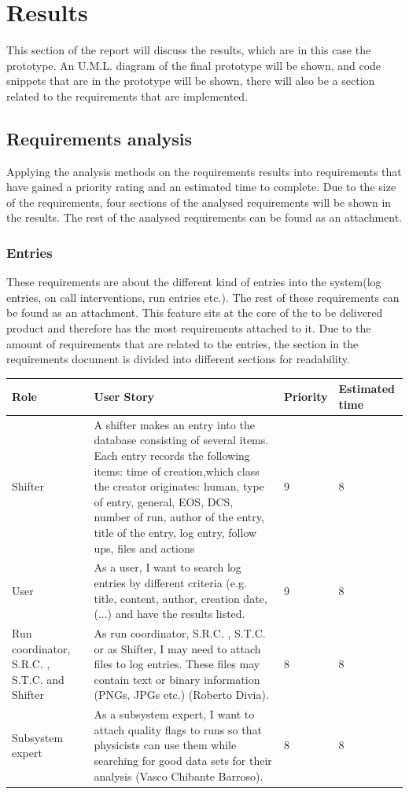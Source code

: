 \documentclass[paper=a4, fontsize=11pt,twoside]{scrartcl}	%
\begin{document}
\section{Results}
This section of the report will discuss the results, which are in this case the prototype. An U.M.L. diagram of the final prototype will be shown, and code snippets that are in the prototype will be shown, there will also be a section related to the requirements that are implemented.
\newpage
\subsection{Requirements analysis}
Applying the analysis methods on the requirements results into requirements that have gained a priority rating and an estimated time to complete. Due to the size of the requirements, four sections of the analysed requirements will be shown in the results. The rest of the analysed requirements can be found as an attachment.\\

\subsubsection{Entries}
These requirements are about the different kind of entries into the system(log entries, on call interventions, run entries etc.). The rest of these requirements can be found as an attachment. This feature sits at the core of the to be delivered product and therefore has the most requirements attached to it. Due to the amount of requirements that are related to the entries, the section in the requirements document is divided into different sections for readability.

\begin{longtable}{ | p{3cm} | p{8cm} | p{1cm} | l |}
\hline
Role & User Story & Priority & Estimated time \\ \hline
Shifter &  A shifter makes an entry into the database consisting of several items. Each entry records the following items: time of creation,which class the creator originates: human, type of entry, general, EOS, DCS, number of run, author of the entry, title of the entry, log entry, follow ups, files and actions & 9 & 8 \\ \hline
User & As a user, I want to search log entries by different criteria (e.g. title, content, author, creation date,(...) and have the results listed. & 9 & 8 \\ \hline
Run coordinator, S.R.C. , S.T.C. and Shifter& As run coordinator, S.R.C. , S.T.C. or as Shifter, I may need to attach files to log entries. These files may contain text or binary information (PNGs, JPGs etc.) (Roberto Divia). & 8 & 8 \\ \hline
Subsystem expert & As a subsystem expert, I want to attach quality flags to runs so that
physicists can use them while searching for good data sets for their analysis (Vasco Chibante Barroso). & 8 & 8 \\ \hline
\end{longtable}
\end{document}
